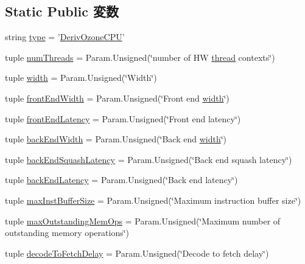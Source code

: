 \subsection*{Static Public 変数}
\begin{DoxyCompactItemize}
\item 
string \hyperlink{classOzoneCPU_1_1DerivOzoneCPU_acce15679d830831b0bbe8ebc2a60b2ca}{type} = '\hyperlink{classOzoneCPU_1_1DerivOzoneCPU}{DerivOzoneCPU}'
\item 
tuple \hyperlink{classOzoneCPU_1_1DerivOzoneCPU_aac03a586f9fcb28bcbe8c3721888fa93}{numThreads} = Param.Unsigned(\char`\"{}number of HW \hyperlink{classOzoneCPU_a46c1be14c8c6673c367ce5c278305858}{thread} contexts\char`\"{})
\item 
tuple \hyperlink{classOzoneCPU_1_1DerivOzoneCPU_a397bb3beea7b21f074bc75e1e71f132f}{width} = Param.Unsigned(\char`\"{}Width\char`\"{})
\item 
tuple \hyperlink{classOzoneCPU_1_1DerivOzoneCPU_a37bf0791ba0c000a4576f8a57e81a9ee}{frontEndWidth} = Param.Unsigned(\char`\"{}Front end \hyperlink{classOzoneCPU_1_1DerivOzoneCPU_a397bb3beea7b21f074bc75e1e71f132f}{width}\char`\"{})
\item 
tuple \hyperlink{classOzoneCPU_1_1DerivOzoneCPU_abd7ffc4273c1209f8030454ead0b8c3e}{frontEndLatency} = Param.Unsigned(\char`\"{}Front end latency\char`\"{})
\item 
tuple \hyperlink{classOzoneCPU_1_1DerivOzoneCPU_acda01682639f669f22b3de5631db15a8}{backEndWidth} = Param.Unsigned(\char`\"{}Back end \hyperlink{classOzoneCPU_1_1DerivOzoneCPU_a397bb3beea7b21f074bc75e1e71f132f}{width}\char`\"{})
\item 
tuple \hyperlink{classOzoneCPU_1_1DerivOzoneCPU_a4237ef2911b088ae0e216acaf38de161}{backEndSquashLatency} = Param.Unsigned(\char`\"{}Back end squash latency\char`\"{})
\item 
tuple \hyperlink{classOzoneCPU_1_1DerivOzoneCPU_a76161b8251998574b56e2dfefcb5f4ff}{backEndLatency} = Param.Unsigned(\char`\"{}Back end latency\char`\"{})
\item 
tuple \hyperlink{classOzoneCPU_1_1DerivOzoneCPU_a7bef7a8f745bad1c4151dadaef30c4f7}{maxInstBufferSize} = Param.Unsigned(\char`\"{}Maximum instruction buffer size\char`\"{})
\item 
tuple \hyperlink{classOzoneCPU_1_1DerivOzoneCPU_a1594a4cde9fee64055e5ce9a3cd28e6a}{maxOutstandingMemOps} = Param.Unsigned(\char`\"{}Maximum number of outstanding memory operations\char`\"{})
\item 
tuple \hyperlink{classOzoneCPU_1_1DerivOzoneCPU_a9ef9ac64d6891064a22ab5d341e691f4}{decodeToFetchDelay} = Param.Unsigned(\char`\"{}Decode to fetch delay\char`\"{})

\end{DoxyCompactItemize}
